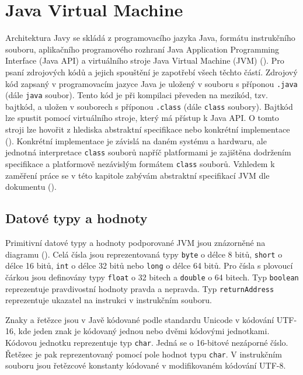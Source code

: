 \chapter{Java Virtual Machine}

Architektura Javy se skládá z programovacího jazyka Java, formátu instrukčního souboru, aplikačního programového rozhraní Java Application Programming Interface (Java API) a virtuálního stroje Java Virtual Machine (JVM) (). Pro psaní zdrojových kódů a jejich spouštění je zapotřebí všech těchto částí.
Zdrojový kód zapsaný v programovacím jazyce Java je uložený v souboru s příponou \texttt{.java} (dále \texttt{java} soubor). Tento kód je při kompilaci převeden na mezikód, tzv. bajtkód, a uložen v souborech s příponou \texttt{.class} (dále \texttt{class} soubory). Bajtkód lze spustit pomocí virtuálního stroje, který má přístup k Java API. O tomto stroji lze hovořit z hlediska abstraktní specifikace nebo konkrétní implementace (). Konkrétní implementace je závislá na daném systému a hardwaru, ale jednotná interpretace \texttt{class} souborů napříč platformami je zajištěna dodržením specifikace a platformově nezávislým formátem \texttt{class} souborů. Vzhledem k zaměření práce se v této kapitole zabývám abstraktní specifikací JVM dle dokumentu (). 

\section{Datové typy a hodnoty}

Primitivní datové typy a hodnoty podporované JVM jsou znázorněné na diagramu (). Celá čísla jsou reprezentovaná typy \texttt{byte} o délce 8 bitů, \texttt{short} o délce 16 bitů, \texttt{int} o délce 32 bitů nebo \texttt{long} o délce 64 bitů. Pro čísla s plovoucí čárkou jsou definovány typy \texttt{float} o 32 bitech a \texttt{double} o 64 bitech. Typ \texttt{boolean} reprezentuje pravdivostní hodnoty pravda a nepravda. Typ \texttt{returnAddress} reprezentuje ukazatel na instrukci v instrukčním souboru.

Znaky a řetězce jsou v Javě kódované podle standardu Unicode v kódování UTF-16, kde jeden znak je kódovaný jednou nebo dvěmi kódovými jednotkami. Kódovou jednotku reprezentuje typ \texttt{char}. Jedná se o 16-bitové nezáporné číslo. Řetězec je pak reprezentovaný pomocí pole hodnot typu \texttt{char}. V instrukčním souboru jsou řetězcové konstanty kódované v modifikovaném kódování UTF-8. 

